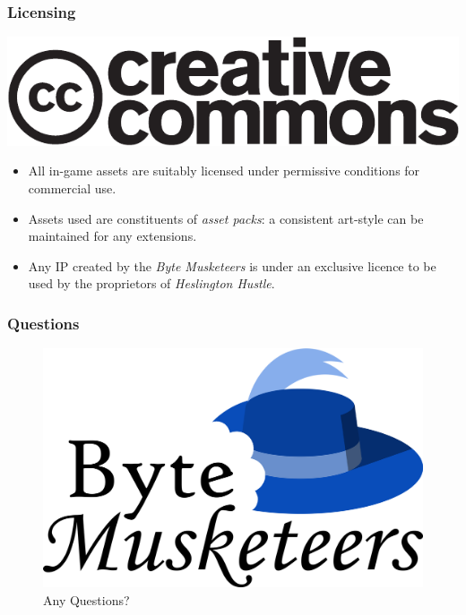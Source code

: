 \documentclass{beamer}
\numberwithin{figure}{section}
\newcommand\gamename{\emph{Heslington Hustle}}
\newcommand\groupname{Byte Musketeers}
\begin{document}
\begin{frame}
    \frametitle{Licensing}
    \begin{center}
        \includegraphics[width=.5\linewidth]{assets/cc-logo}
    \end{center}
    \begin{itemize}
        \item All in-game assets are suitably licensed under permissive
            conditions for commercial use.
        \item Assets used are constituents of \emph{asset packs}: a consistent
            art-style can be maintained for any extensions.
        \item Any IP created by the \emph{\groupname} is under an exclusive
            licence to be used by the proprietors of \gamename.
    \end{itemize}
\end{frame}
\begin{frame}
    \frametitle{Questions}
    \begin{figure}
        \includegraphics[width=0.3\linewidth]{../logo}
        \vfill\caption*{\Large Any Questions?}
    \end{figure}
\end{frame}
\end{document}

